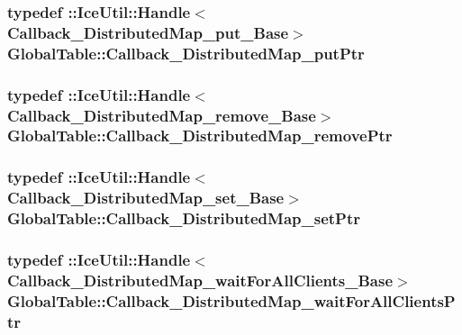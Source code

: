 \label{namespace_global_table_afeefcdd5dfb862806549e834b8727011}
\hypertarget{namespace_global_table_a652e5fcf9acdfd0d854019d109b9644a}{
\subsubsection[{Callback\_\-DistributedMap\_\-putPtr}]{\setlength{\rightskip}{0pt plus 5cm}typedef ::IceUtil::Handle$<$ {\bf Callback\_\-DistributedMap\_\-put\_\-Base}$>$ {\bf GlobalTable::Callback\_\-DistributedMap\_\-putPtr}}}
\label{namespace_global_table_a652e5fcf9acdfd0d854019d109b9644a}
\hypertarget{namespace_global_table_a38ad32022b6559c698996becbe357749}{
\subsubsection[{Callback\_\-DistributedMap\_\-removePtr}]{\setlength{\rightskip}{0pt plus 5cm}typedef ::IceUtil::Handle$<$ {\bf Callback\_\-DistributedMap\_\-remove\_\-Base}$>$ {\bf GlobalTable::Callback\_\-DistributedMap\_\-removePtr}}}
\label{namespace_global_table_a38ad32022b6559c698996becbe357749}
\hypertarget{namespace_global_table_a8196b91ca3241e16fd9aac727da95e02}{
\subsubsection[{Callback\_\-DistributedMap\_\-setPtr}]{\setlength{\rightskip}{0pt plus 5cm}typedef ::IceUtil::Handle$<$ {\bf Callback\_\-DistributedMap\_\-set\_\-Base}$>$ {\bf GlobalTable::Callback\_\-DistributedMap\_\-setPtr}}}
\label{namespace_global_table_a8196b91ca3241e16fd9aac727da95e02}
\hypertarget{namespace_global_table_a110ac4602b8f6c72aa866923747317e3}{
\subsubsection[{Callback\_\-DistributedMap\_\-waitForAllClientsPtr}]{\setlength{\rightskip}{0pt plus 5cm}typedef ::IceUtil::Handle$<$ {\bf Callback\_\-DistributedMap\_\-waitForAllClients\_\-Base}$>$ {\bf GlobalTable::Callback\_\-DistributedMap\_\-waitForAllClientsPtr}}}

